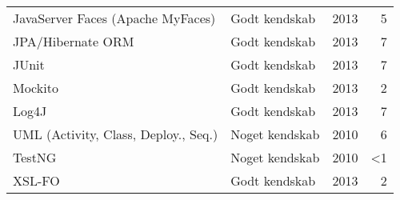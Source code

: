 \documentclass[a4paper,11pt]{article}
\begin{document}
\begin{tabularx}{\textwidth}{X l r r}
  JavaServer Faces (Apache MyFaces)         & Godt kendskab   & 2013  &     5 \\
  JPA/Hibernate ORM                         & Godt kendskab   & 2013  &     7 \\
  JUnit                                     & Godt kendskab   & 2013  &     7 \\
  Mockito                                   & Godt kendskab   & 2013  &     2 \\
  Log4J                                     & Godt kendskab   & 2013  &     7 \\
  UML (Activity, Class, Deploy., Seq.)      & Noget kendskab  & 2010  &     6 \\
  TestNG                                    & Noget kendskab  & 2010  &    <1 \\
  XSL-FO                                    & Godt kendskab   & 2013  &     2 \\
  \hline
\end{tabularx}
\end{document}
